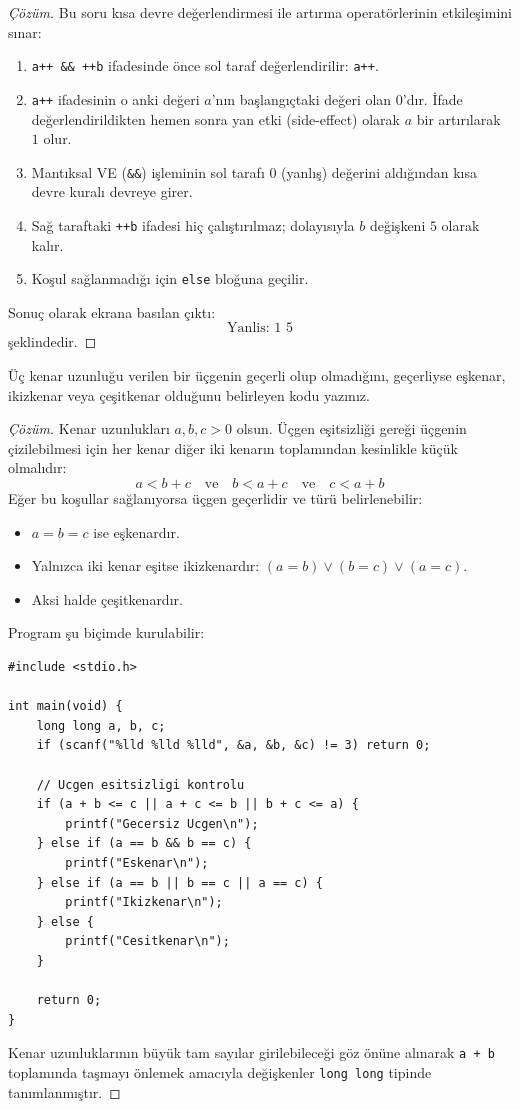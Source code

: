 \begin{proof}[Çözüm]
Bu soru kısa devre değerlendirmesi ile artırma operatörlerinin etkileşimini sınar:
\begin{enumerate}
    \item \texttt{a++ \&\& ++b} ifadesinde önce sol taraf değerlendirilir: \texttt{a++}.
    \item \texttt{a++} ifadesinin o anki değeri $a$'nın başlangıçtaki değeri olan $0$'dır. İfade değerlendirildikten hemen sonra yan etki (side-effect) olarak $a$ bir artırılarak $1$ olur.
    \item Mantıksal VE (\texttt{\&\&}) işleminin sol tarafı $0$ (yanlış) değerini aldığından kısa devre kuralı devreye girer.
    \item Sağ taraftaki \texttt{++b} ifadesi hiç çalıştırılmaz; dolayısıyla $b$ değişkeni $5$ olarak kalır.
    \item Koşul sağlanmadığı için \texttt{else} bloğuna geçilir.
\end{enumerate}
Sonuç olarak ekrana basılan çıktı:
\[
\text{Yanlis: 1 5}
\]
şeklindedir.
\end{proof}

\begin{example}
Üç kenar uzunluğu verilen bir üçgenin geçerli olup olmadığını, geçerliyse eşkenar, ikizkenar veya çeşitkenar olduğunu belirleyen kodu yazınız.
\end{example}

\begin{proof}[Çözüm]
Kenar uzunlukları $a, b, c > 0$ olsun. Üçgen eşitsizliği gereği üçgenin çizilebilmesi için her kenar diğer iki kenarın toplamından kesinlikle küçük olmalıdır:
\[
a < b + c \quad \text{ve} \quad b < a + c \quad \text{ve} \quad c < a + b
\]
Eğer bu koşullar sağlanıyorsa üçgen geçerlidir ve türü belirlenebilir:
\begin{itemize}
    \item $a = b = c$ ise eşkenardır.
    \item Yalnızca iki kenar eşitse ikizkenardır: $(a = b) \lor (b = c) \lor (a = c)$.
    \item Aksi halde çeşitkenardır.
\end{itemize}

Program şu biçimde kurulabilir:
\begin{lstlisting}[language=CTemel]
#include <stdio.h>

int main(void) {
    long long a, b, c;
    if (scanf("%lld %lld %lld", &a, &b, &c) != 3) return 0;

    // Ucgen esitsizligi kontrolu
    if (a + b <= c || a + c <= b || b + c <= a) {
        printf("Gecersiz Ucgen\n");
    } else if (a == b && b == c) {
        printf("Eskenar\n");
    } else if (a == b || b == c || a == c) {
        printf("Ikizkenar\n");
    } else {
        printf("Cesitkenar\n");
    }

    return 0;
}
\end{lstlisting}
Kenar uzunluklarının büyük tam sayılar girilebileceği göz önüne alınarak \texttt{a + b} toplamında taşmayı önlemek amacıyla değişkenler \texttt{long long} tipinde tanımlanmıştır.
\end{proof}

